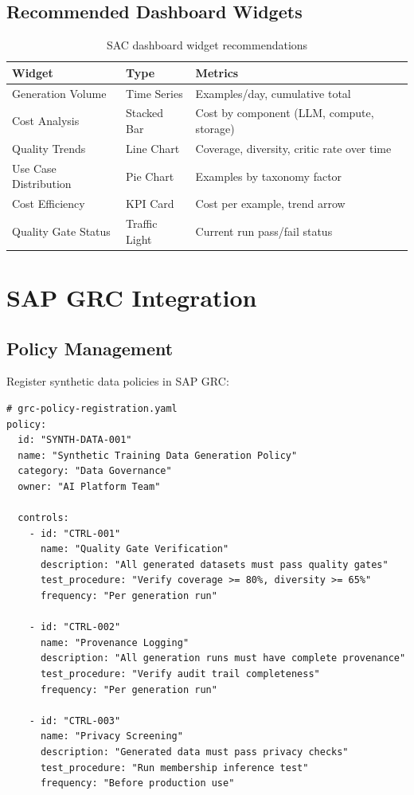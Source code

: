 \subsection{Recommended Dashboard Widgets}

\begin{table}[H]
\centering
\caption{SAC dashboard widget recommendations}
\label{tab:sac-widgets}
\footnotesize
\begin{tabularx}{\textwidth}{@{}l l X@{}}
\toprule
\textbf{Widget} & \textbf{Type} & \textbf{Metrics} \\
\midrule
Generation Volume & Time Series & Examples/day, cumulative total \\
Cost Analysis & Stacked Bar & Cost by component (LLM, compute, storage) \\
Quality Trends & Line Chart & Coverage, diversity, critic rate over time \\
Use Case Distribution & Pie Chart & Examples by taxonomy factor \\
Cost Efficiency & KPI Card & Cost per example, trend arrow \\
Quality Gate Status & Traffic Light & Current run pass/fail status \\
\bottomrule
\end{tabularx}
\end{table}


\section{SAP GRC Integration}

\subsection{Policy Management}

Register synthetic data policies in SAP GRC:

\begin{lstlisting}[language=yamlx,caption={GRC policy registration}]
# grc-policy-registration.yaml
policy:
  id: "SYNTH-DATA-001"
  name: "Synthetic Training Data Generation Policy"
  category: "Data Governance"
  owner: "AI Platform Team"
  
  controls:
    - id: "CTRL-001"
      name: "Quality Gate Verification"
      description: "All generated datasets must pass quality gates"
      test_procedure: "Verify coverage >= 80%, diversity >= 65%"
      frequency: "Per generation run"
      
    - id: "CTRL-002"
      name: "Provenance Logging"
      description: "All generation runs must have complete provenance"
      test_procedure: "Verify audit trail completeness"
      frequency: "Per generation run"
      
    - id: "CTRL-003"
      name: "Privacy Screening"
      description: "Generated data must pass privacy checks"
      test_procedure: "Run membership inference test"
      frequency: "Before production use"
\end{lstlisting}

